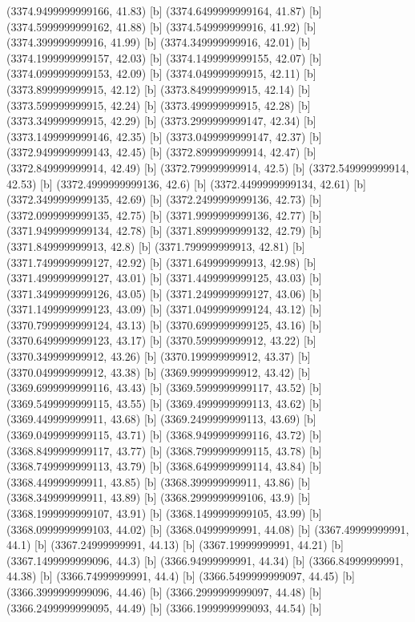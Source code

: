 {{{(3374.9499999999166, 41.83) [b] 
(3374.6499999999164, 41.87) [b] 
(3374.5999999999162, 41.88) [b] 
(3374.549999999916, 41.92) [b] 
(3374.399999999916, 41.99) [b] 
(3374.349999999916, 42.01) [b] 
(3374.1999999999157, 42.03) [b] 
(3374.1499999999155, 42.07) [b] 
(3374.0999999999153, 42.09) [b] 
(3374.049999999915, 42.11) [b] 
(3373.899999999915, 42.12) [b] 
(3373.849999999915, 42.14) [b] 
(3373.599999999915, 42.24) [b] 
(3373.499999999915, 42.28) [b] 
(3373.349999999915, 42.29) [b] 
(3373.2999999999147, 42.34) [b] 
(3373.1499999999146, 42.35) [b] 
(3373.0499999999147, 42.37) [b] 
(3372.9499999999143, 42.45) [b] 
(3372.899999999914, 42.47) [b] 
(3372.849999999914, 42.49) [b] 
(3372.799999999914, 42.5) [b] 
(3372.549999999914, 42.53) [b] 
(3372.4999999999136, 42.6) [b] 
(3372.4499999999134, 42.61) [b] 
(3372.3499999999135, 42.69) [b] 
(3372.2499999999136, 42.73) [b] 
(3372.0999999999135, 42.75) [b] 
(3371.9999999999136, 42.77) [b] 
(3371.9499999999134, 42.78) [b] 
(3371.8999999999132, 42.79) [b] 
(3371.849999999913, 42.8) [b] 
(3371.799999999913, 42.81) [b] 
(3371.7499999999127, 42.92) [b] 
(3371.649999999913, 42.98) [b] 
(3371.4999999999127, 43.01) [b] 
(3371.4499999999125, 43.03) [b] 
(3371.3499999999126, 43.05) [b] 
(3371.2499999999127, 43.06) [b] 
(3371.1499999999123, 43.09) [b] 
(3371.0499999999124, 43.12) [b] 
(3370.7999999999124, 43.13) [b] 
(3370.6999999999125, 43.16) [b] 
(3370.6499999999123, 43.17) [b] 
(3370.599999999912, 43.22) [b] 
(3370.349999999912, 43.26) [b] 
(3370.199999999912, 43.37) [b] 
(3370.049999999912, 43.38) [b] 
(3369.999999999912, 43.42) [b] 
(3369.6999999999116, 43.43) [b] 
(3369.5999999999117, 43.52) [b] 
(3369.5499999999115, 43.55) [b] 
(3369.4999999999113, 43.62) [b] 
(3369.449999999911, 43.68) [b] 
(3369.2499999999113, 43.69) [b] 
(3369.0499999999115, 43.71) [b] 
(3368.9499999999116, 43.72) [b] 
(3368.8499999999117, 43.77) [b] 
(3368.7999999999115, 43.78) [b] 
(3368.7499999999113, 43.79) [b] 
(3368.6499999999114, 43.84) [b] 
(3368.449999999911, 43.85) [b] 
(3368.399999999911, 43.86) [b] 
(3368.349999999911, 43.89) [b] 
(3368.2999999999106, 43.9) [b] 
(3368.1999999999107, 43.91) [b] 
(3368.1499999999105, 43.99) [b] 
(3368.0999999999103, 44.02) [b] 
(3368.04999999991, 44.08) [b] 
(3367.49999999991, 44.1) [b] 
(3367.24999999991, 44.13) [b] 
(3367.19999999991, 44.21) [b] 
(3367.1499999999096, 44.3) [b] 
(3366.94999999991, 44.34) [b] 
(3366.84999999991, 44.38) [b] 
(3366.74999999991, 44.4) [b] 
(3366.5499999999097, 44.45) [b] 
(3366.3999999999096, 44.46) [b] 
(3366.2999999999097, 44.48) [b] 
(3366.2499999999095, 44.49) [b] 
(3366.1999999999093, 44.54) [b] 
}}}
